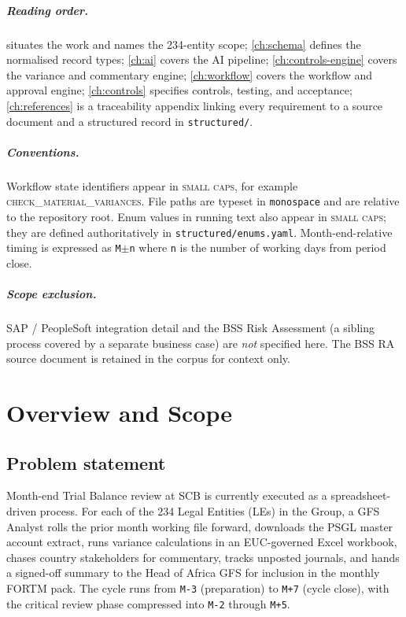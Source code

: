 \documentclass[11pt,a4paper,twoside]{report}
\newcommand{\corpus}{}
\newcommand{\stateid}[1]{\textsc{\lowercase{#1}}}
\begin{document}
\paragraph{Reading order.}  situates the work and
names the 234-entity scope; \cref{ch:schema} defines the normalised
record types; \cref{ch:ai} covers the AI pipeline; \cref{ch:controls-engine}
covers the variance and commentary engine; \cref{ch:workflow} covers
the workflow and approval engine; \cref{ch:controls} specifies controls,
testing, and acceptance; \cref{ch:references} is a traceability
appendix linking every requirement to a source document and a structured
record in \corpus\texttt{structured/}.

\paragraph{Conventions.} Workflow state identifiers appear in
\textsc{small caps}, for example \stateid{CHECK\_MATERIAL\_VARIANCES}.
File paths are typeset in \texttt{monospace} and are relative to the
repository root. Enum values in running text also appear in
\textsc{small caps}; they are defined authoritatively in
\corpus\texttt{structured/enums.yaml}. Month-end-relative timing is
expressed as \texttt{M$\pm$n} where \texttt{n} is the number of working
days from period close.

\paragraph{Scope exclusion.} SAP / PeopleSoft integration detail and the
BSS Risk Assessment (a sibling process covered by a separate business
case) are \emph{not} specified here. The BSS RA source document is
retained in the corpus for context only.
\chapter{Overview and Scope}\label{ch:overview}

\section{Problem statement}

Month-end Trial Balance review at SCB is currently executed as a
spreadsheet-driven process. For each of the 234 Legal Entities (LEs)
in the Group, a GFS Analyst rolls the prior month working file
forward, downloads the PSGL master account extract, runs variance
calculations in an EUC-governed Excel workbook, chases country
stakeholders for commentary, tracks unposted journals, and hands a
signed-off summary to the Head of Africa GFS for inclusion in the
monthly FORTM pack. The cycle runs from \texttt{M-3} (preparation) to
\texttt{M+7} (cycle close), with the critical review phase compressed
into \texttt{M-2} through \texttt{M+5}.
\end{document}
